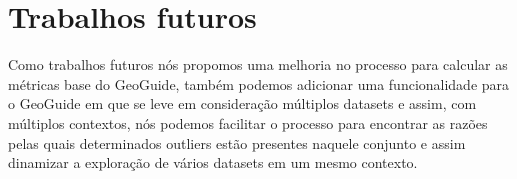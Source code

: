 

\section{Trabalhos futuros}

Como trabalhos futuros nós propomos uma melhoria no processo para calcular as métricas base do GeoGuide, também podemos adicionar uma funcionalidade para o GeoGuide em que se leve em consideração múltiplos datasets e assim, com múltiplos contextos, nós podemos facilitar o processo para encontrar as razões pelas quais determinados outliers estão presentes naquele conjunto e assim dinamizar a exploração de vários datasets em um mesmo contexto. 